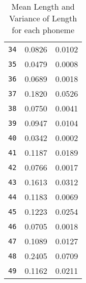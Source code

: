 \begin{table}[th]
\begin{tabular}{lcc}
\verb|34| & 0.0826 & 0.0102 \\
\verb|35| & 0.0479 & 0.0008 \\
\verb|36| & 0.0689 & 0.0018 \\
\verb|37| & 0.1820 & 0.0526 \\
\verb|38| & 0.0750 & 0.0041 \\
\verb|39| & 0.0947 & 0.0104 \\
\verb|40| & 0.0342 & 0.0002 \\
\verb|41| & 0.1187 & 0.0189 \\
\verb|42| & 0.0766 & 0.0017 \\
\verb|43| & 0.1613 & 0.0312 \\
\verb|44| & 0.1183 & 0.0069 \\
\verb|45| & 0.1223 & 0.0254 \\
\verb|46| & 0.0705 & 0.0018 \\
\verb|47| & 0.1089 & 0.0127 \\
\verb|48| & 0.2405 & 0.0709 \\
\verb|49| & 0.1162 & 0.0211 \\\hline
\end{tabular}
\caption{Mean Length and Variance of Length for each phoneme}
\label{tab:mlvl}
\end{table}


